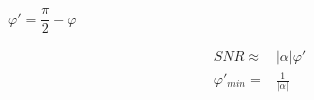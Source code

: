 \documentclass[10pt,fleqn]{article}
\newcommand{\eqar}[1]
{
  \begin{align*}
    #1
  \end{align*}
}
\newcommand{\abs}[1]{{\left|{#1}\right|}}
\begin{document}
\subsection{}
$\varphi'=\dfrac\pi2-\varphi$
\eqar{
  SNR\approx&\abs{\alpha}\varphi'\\
  \varphi'_{min}=&\frac{1}{\abs{\alpha}}
}
\subsection{}
\subsection{}
\end{document}
